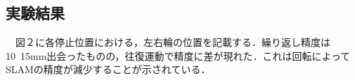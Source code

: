 \subsection{実験結果}
　図２に各停止位置における，左右輪の位置を記載する．繰り返し精度は10~15mm出会ったものの，往復運動で精度に差が現れた．これは回転によってSLAMの精度が減少することが示されている．

